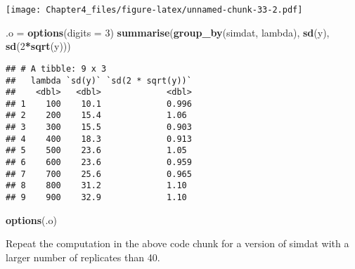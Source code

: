 \documentclass[]{article}
\newenvironment{Shaded}{\begin{snugshade}}{\end{snugshade}}
\newcommand{\CommentTok}[1]{\textcolor[rgb]{0.56,0.35,0.01}{\textit{#1}}}
\newcommand{\ControlFlowTok}[1]{\textcolor[rgb]{0.13,0.29,0.53}{\textbf{#1}}}
\newcommand{\DataTypeTok}[1]{\textcolor[rgb]{0.13,0.29,0.53}{#1}}
\newcommand{\DecValTok}[1]{\textcolor[rgb]{0.00,0.00,0.81}{#1}}
\newcommand{\FloatTok}[1]{\textcolor[rgb]{0.00,0.00,0.81}{#1}}
\newcommand{\KeywordTok}[1]{\textcolor[rgb]{0.13,0.29,0.53}{\textbf{#1}}}
\newcommand{\NormalTok}[1]{#1}
\newcommand{\OperatorTok}[1]{\textcolor[rgb]{0.81,0.36,0.00}{\textbf{#1}}}
\newcommand{\StringTok}[1]{\textcolor[rgb]{0.31,0.60,0.02}{#1}}
\begin{document}
\texttt{[image: Chapter4\_files/figure-latex/unnamed-chunk-33-2.pdf]}

\begin{Shaded}
\begin{Highlighting}[]
\NormalTok{.o =}\StringTok{ }\KeywordTok{options}\NormalTok{(}\DataTypeTok{digits =} \DecValTok{3}\NormalTok{)}
\KeywordTok{summarise}\NormalTok{(}\KeywordTok{group_by}\NormalTok{(simdat, lambda), }\KeywordTok{sd}\NormalTok{(y), }\KeywordTok{sd}\NormalTok{(}\DecValTok{2}\OperatorTok{*}\KeywordTok{sqrt}\NormalTok{(y)))}
\end{Highlighting}
\end{Shaded}

\begin{verbatim}
## # A tibble: 9 x 3
##   lambda `sd(y)` `sd(2 * sqrt(y))`
##    <dbl>   <dbl>             <dbl>
## 1    100    10.1             0.996
## 2    200    15.4             1.06 
## 3    300    15.5             0.903
## 4    400    18.3             0.913
## 5    500    23.6             1.05 
## 6    600    23.6             0.959
## 7    700    25.6             0.965
## 8    800    31.2             1.10 
## 9    900    32.9             1.10
\end{verbatim}

\begin{Shaded}
\begin{Highlighting}[]
\KeywordTok{options}\NormalTok{(.o)}
\end{Highlighting}
\end{Shaded}

Repeat the computation in the above code chunk for a version of simdat
with a larger number of replicates than 40.

\begin{Shaded}
\end{Shaded}
\end{document}
